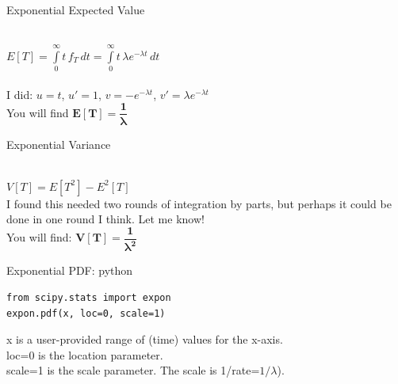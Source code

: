 \documentclass[10pt,sans,english,compress,xcolor=dvipsnames]{beamer}
\begin{document}
\begin{frame}{Exponential Expected Value}

\\[1ex]

$E[T]  = \int\limits_0^{\infty} t\, f_T\, dt = \int\limits_0^{\infty} t\, \lambda e^{-\lambda t} \, dt $\\[1ex]


\\[1ex]

I did: $u =t$, $u'=1$, $v = -e^{-\lambda t}$, $v'= \lambda e^{-\lambda t}$\\[1ex]

You will find $\mathbf{E[T]  = \dfrac{1}{\lambda}}$\\[1ex]

\end{frame} 


\begin{frame}{Exponential Variance}

\\[1ex]

$V[T]  =E[T^2] - E^2[T]$\\[1ex]

I found this needed two rounds of integration by parts, but perhaps it could be done in one round I think. Let me know!\\[1ex]

You will find: $\mathbf{V[T] = \dfrac{1}{\lambda^2}}$

\end{frame} 



\begin{frame}[fragile]{Exponential PDF: python}

\begin{verbatim}
from scipy.stats import expon
expon.pdf(x, loc=0, scale=1)
\end{verbatim}

\vspace{0.5cm}

x is a user-provided range of (time) values for the x-axis.\\[2ex]
loc=0 is the location parameter.\\[2ex]
scale=1 is the scale parameter. The scale is 1/rate=$1/\lambda$).\\[2ex]

\end{frame}
\end{document}
